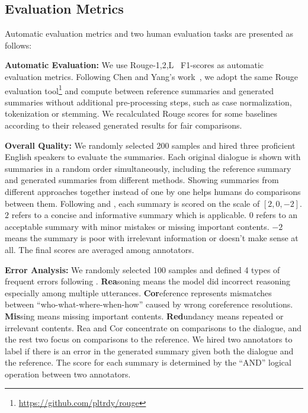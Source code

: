 \subsection{Evaluation Metrics}\label{sec:humansetup}
Automatic evaluation metrics and two human evaluation tasks are presented
as follows:

\textbf{Automatic Evaluation:} We use Rouge-1,2,L~\cite{lin2004rouge} F1-scores as automatic evaluation metrics. Following Chen and Yang's work~, we adopt the same Rouge evaluation tool\footnote{\url{https://github.com/pltrdy/rouge}} and compute between reference summaries and generated summaries without additional pre-processing steps, such as case normalization, tokenization or stemming. We recalculated Rouge scores for some baselines according to their released generated results for fair comparisons.%

\textbf{Overall Quality:} We randomly selected 200 samples and hired three proficient English speakers to evaluate the summaries. 
Each original dialogue is shown with summaries in a random order simultaneously, including the reference summary and generated summaries from different methods. Showing summaries from different approaches together instead of one by one helps humans do comparisons between them.
Following \citet{chen2020multi} and \citet{liu2021coreference}, each summary is scored on the scale of $[2, 0, -2]$. $2$ refers to a concise and informative summary which is applicable. $0$ refers to an acceptable summary with minor mistakes or missing important contents. $-2$ means the summary is poor with irrelevant information or doesn't make sense at all. The final scores are averaged among annotators.%

\textbf{Error Analysis:} We randomly selected 100 samples and defined 4 types of frequent errors following \citet{chen2020multi}. \textbf{Rea}soning means the model did incorrect reasoning especially among multiple utterances.
\textbf{Cor}eference represents mismatches between ``who-what-where-when-how'' caused by wrong coreference resolutions.
\textbf{Mis}sing means missing important contents.
\textbf{Red}undancy means repeated or irrelevant contents.
Rea and Cor concentrate on comparisons to the dialogue, 
and the rest two focus on comparisons to the reference. 
We hired two annotators to label if there is an error in the generated 
summary given both the dialogue and the reference. The score for each 
summary is determined by the ``AND'' logical operation between two annotators.

